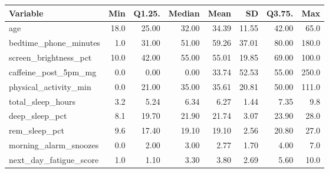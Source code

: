 
\begin{tabular}{lrrrrrrr}
\toprule
Variable & Min & Q1.25. & Median & Mean & SD & Q3.75. & Max\\
\midrule
age & 18.0 & 25.00 & 32.00 & 34.39 & 11.55 & 42.00 & 65.0\\
bedtime\_phone\_minutes & 1.0 & 31.00 & 51.00 & 59.26 & 37.01 & 80.00 & 180.0\\
screen\_brightness\_pct & 10.0 & 42.00 & 55.00 & 55.01 & 19.85 & 69.00 & 100.0\\
caffeine\_post\_5pm\_mg & 0.0 & 0.00 & 0.00 & 33.74 & 52.53 & 55.00 & 250.0\\
physical\_activity\_min & 0.0 & 21.00 & 35.00 & 35.61 & 20.81 & 50.00 & 111.0\\
total\_sleep\_hours & 3.2 & 5.24 & 6.34 & 6.27 & 1.44 & 7.35 & 9.8\\
deep\_sleep\_pct & 8.1 & 19.70 & 21.90 & 21.74 & 3.07 & 23.90 & 28.0\\
rem\_sleep\_pct & 9.6 & 17.40 & 19.10 & 19.10 & 2.56 & 20.80 & 27.0\\
morning\_alarm\_snoozes & 0.0 & 2.00 & 3.00 & 2.77 & 1.70 & 4.00 & 7.0\\
next\_day\_fatigue\_score & 1.0 & 1.10 & 3.30 & 3.80 & 2.69 & 5.60 & 10.0\\
\bottomrule
\end{tabular}

